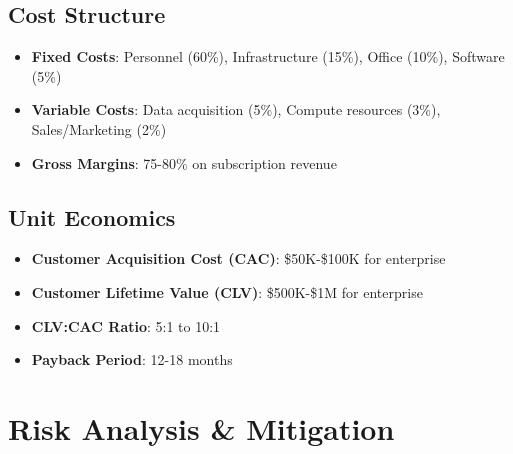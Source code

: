 \documentclass[business]{../templates/infraradar-main}
\begin{document}
\subsection{Cost Structure}
\begin{itemize}
    \item \textbf{Fixed Costs}: Personnel (60\%), Infrastructure (15\%), Office (10\%), Software (5\%)
    \item \textbf{Variable Costs}: Data acquisition (5\%), Compute resources (3\%), Sales/Marketing (2\%)
    \item \textbf{Gross Margins}: 75-80\% on subscription revenue
\end{itemize}

\subsection{Unit Economics}
\begin{itemize}
    \item \textbf{Customer Acquisition Cost (CAC)}: \$50K-\$100K for enterprise
    \item \textbf{Customer Lifetime Value (CLV)}: \$500K-\$1M for enterprise
    \item \textbf{CLV:CAC Ratio}: 5:1 to 10:1
    \item \textbf{Payback Period}: 12-18 months
\end{itemize}

\section{Risk Analysis \& Mitigation}
\end{document}
